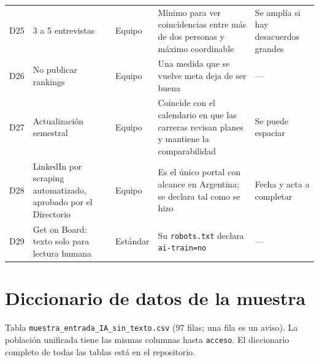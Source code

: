 \documentclass[11pt,a4paper]{article}
\begin{document}
\begin{footnotesize}
\begin{longtable}{@{}c L{2.9cm} L{1.9cm} L{4.6cm} L{3.4cm}@{}}
D25 & 3 a 5 entrevistas & Equipo & Mínimo para ver coincidencias entre más de dos personas y máximo coordinable & Se amplía si hay desacuerdos grandes\\
D26 & No publicar rankings & Equipo & Una medida que se vuelve meta deja de ser buena \cite{strathern1997} & ---\\
D27 & Actualización semestral & Equipo & Coincide con el calendario en que las carreras revisan planes y mantiene la comparabilidad & Se puede espaciar\\
D28 & LinkedIn por scraping automatizado, aprobado por el Directorio & Equipo & Es el único portal con alcance en Argentina; se declara tal como se hizo & Fecha y acta a completar\\
D29 & Get on Board: texto solo para lectura humana & Estándar & Su \texttt{robots.txt} declara \texttt{ai-train=no} & ---\\
\bottomrule
\end{longtable}
\end{footnotesize}

\section{Diccionario de datos de la muestra}\label{anx:datos}
Tabla \texttt{muestra\_entrada\_IA\_sin\_texto.csv} (97 filas; una fila es un aviso). La población unificada tiene las mismas columnas hasta \texttt{acceso}. El diccionario completo de todas las tablas está en el repositorio.
\end{document}
